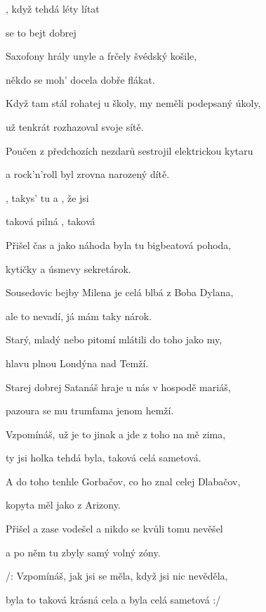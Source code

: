 

\zs
{}, když tehdá  léty
 lítat 

 se to bejt  dobrej  

Saxofony hrály unyle a frčely švédský košile,

někdo se moh' docela dobře flákat.
\ks

\zs
Když tam stál rohatej u školy, my neměli podepsaný úkoly,

už tenkrát rozhazoval svoje sítě.

Poučen z předchozích nezdarů sestrojil elektrickou kytaru

a rock'n'roll byl zrovna narozený dítě.
\ks

\zr
{}, takys' tu  a , že jsi 

taková  pilná , taková        
\kr

\zs
Přišel čas a jako náhoda byla tu bigbeatová pohoda,

kytičky a úsmevy sekretárok.

Sousedovic bejby Milena je celá blbá z Boba Dylana,

ale to nevadí, já mám taky nárok.
\ks

\zs
Starý, mladý nebo pitomí mlátili do toho jako my,

hlavu plnou Londýna nad Temží.

Starej dobrej Satanáš hraje u nás v hospodě mariáš,

pazoura se mu trumfama jenom hemží.
\ks

\zr
Vzpomínáš, už je to jinak a jde z toho na mě zima,

ty jsi holka tehdá byla, taková celá sametová.
\kr

\zs
A do toho tenhle Gorbačov, co ho znal celej Dlabačov,

kopyta měl jako z Arizony.

Přišel a zase vodešel a nikdo se kvůli tomu nevěšel

a po něm tu zbyly samý volný zóny.
\ks

\zr
/: Vzpomínáš, jak jsi se měla,
když jsi nic nevěděla,

byla to taková krásná cela a byla celá sametová :/
\kr

